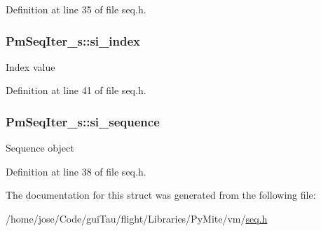 Definition at line 35 of file seq.\-h.

\hypertarget{struct_pm_seq_iter__s_a57ff61771c7f464a8cada8f517502c37}{
\subsubsection[{si\-\_\-index}]{ Pm\-Seq\-Iter\-\_\-s\-::si\-\_\-index}}\label{struct_pm_seq_iter__s_a57ff61771c7f464a8cada8f517502c37}
Index value 

Definition at line 41 of file seq.\-h.

\hypertarget{struct_pm_seq_iter__s_ae8a29eb27845a6f888c6057f84e68cf5}{
\subsubsection[{si\-\_\-sequence}]{ Pm\-Seq\-Iter\-\_\-s\-::si\-\_\-sequence}}\label{struct_pm_seq_iter__s_ae8a29eb27845a6f888c6057f84e68cf5}
Sequence object 

Definition at line 38 of file seq.\-h.



The documentation for this struct was generated from the following file\-:\begin{DoxyCompactItemize}
\item 
/home/jose/\-Code/gui\-Tau/flight/\-Libraries/\-Py\-Mite/vm/\hyperlink{seq_8h}{seq.\-h}\end{DoxyCompactItemize}
